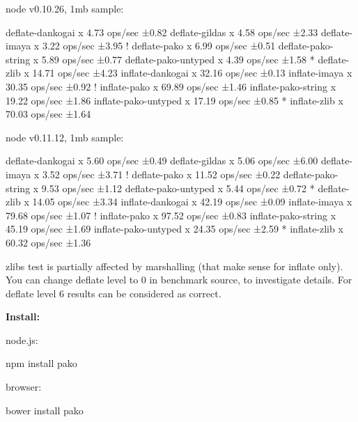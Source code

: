 \begin{DoxyCode}
node v0.10.26, 1mb sample:

   deflate-dankogai x 4.73 ops/sec ±0.82%
   deflate-gildas x 4.58 ops/sec ±2.33%
   deflate-imaya x 3.22 ops/sec ±3.95%
 ! deflate-pako x 6.99 ops/sec ±0.51%
   deflate-pako-string x 5.89 ops/sec ±0.77%
   deflate-pako-untyped x 4.39 ops/sec ±1.58%
 * deflate-zlib x 14.71 ops/sec ±4.23%
   inflate-dankogai x 32.16 ops/sec ±0.13%
   inflate-imaya x 30.35 ops/sec ±0.92%
 ! inflate-pako x 69.89 ops/sec ±1.46%
   inflate-pako-string x 19.22 ops/sec ±1.86%
   inflate-pako-untyped x 17.19 ops/sec ±0.85%
 * inflate-zlib x 70.03 ops/sec ±1.64%

node v0.11.12, 1mb sample:

   deflate-dankogai x 5.60 ops/sec ±0.49%
   deflate-gildas x 5.06 ops/sec ±6.00%
   deflate-imaya x 3.52 ops/sec ±3.71%
 ! deflate-pako x 11.52 ops/sec ±0.22%
   deflate-pako-string x 9.53 ops/sec ±1.12%
   deflate-pako-untyped x 5.44 ops/sec ±0.72%
 * deflate-zlib x 14.05 ops/sec ±3.34%
   inflate-dankogai x 42.19 ops/sec ±0.09%
   inflate-imaya x 79.68 ops/sec ±1.07%
 ! inflate-pako x 97.52 ops/sec ±0.83%
   inflate-pako-string x 45.19 ops/sec ±1.69%
   inflate-pako-untyped x 24.35 ops/sec ±2.59%
 * inflate-zlib x 60.32 ops/sec ±1.36%
\end{DoxyCode}


zlib\textquotesingle{}s test is partially affected by marshalling (that make sense for inflate only). You can change deflate level to 0 in benchmark source, to investigate details. For deflate level 6 results can be considered as correct.

{\bfseries Install\+:}

node.\+js\+:


\begin{DoxyCode}
npm install pako
\end{DoxyCode}


browser\+:


\begin{DoxyCode}
bower install pako
\end{DoxyCode}


